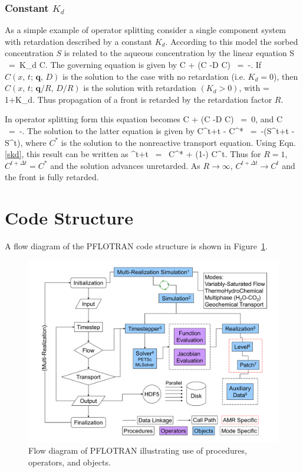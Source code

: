 \documentclass[12pt]{article}
\def\EQ#1\EN{\begin{equation}#1\end{equation}}
\newcommand{\eq}{\ =\ }
\newcommand{\p}{{\partial}}
\newcommand{\bnabla}{\boldsymbol{\nabla}}
\newcommand{\bq}{\boldsymbol{q}}
\begin{document}
\subsubsection{Constant $K_d$}

As a simple example of operator splitting consider a single component system with retardation described by a constant $K_d$. According to this model the sorbed concentration $S$ is related to the aqueous concentration by the linear equation
\EQ\label{skd}
S \eq K_d C.
\EN
The governing equation is given by
\EQ
\frac{\p}{\p t} \varphi C + \bnabla\cdot\big(\bq C -\varphi D \bnabla C\big) \eq -\frac{\p S}{\p t}.
\EN
If $C(x,\,t;\, \bq,\,D)$ is the solution to the case with no retardation (i.e. $K_d=0$), then $C(x,\,t;\, \bq/R,\,D/R)$ is the solution with retardation $(K_d>0)$,
with
\EQ
R = 1+K_d.
\EN
Thus propagation of a front is retarded by the retardation factor $R$.

In operator splitting form this equation becomes
\EQ
\frac{\p}{\p t} \varphi C + \bnabla\cdot\big(\bq C -\varphi D \bnabla C\big) \eq 0,
\EN
and
\EQ
\frac{d}{d t} \varphi C \eq -.
\EN
The solution to the latter equation is given by
\EQ
\varphi C^{t+\Delta t} - \varphi C^* \eq -\big(S^{t+\Delta t} - S^t\big),
\EN
where $C^*$ is the solution to the nonreactive transport equation. Using Eqn.\eqref{skd}, this result can be written as
\EQ
C^{t+\Delta t} \eq {} C^* + \left(1-\right) C^t.
\EN
Thus for $R=1$, $C^{t+\Delta t}=C^*$ and the solution advances unretarded. As $R\rightarrow\infty$, $C^{t+\Delta t} \rightarrow C^t$ and the front is fully retarded.

\newpage

\section{Code Structure}

A flow diagram of the PFLOTRAN code structure is shown in Figure~\ref{fdiag}.

\begin{figure}[h]\centering
\includegraphics[scale=0.3]{./figs/multi-realization_flowchart}
\caption{Flow diagram of PFLOTRAN illustrating use of procedures, operators, and objects.}\label{fdiag}
\end{figure}
\end{document}
